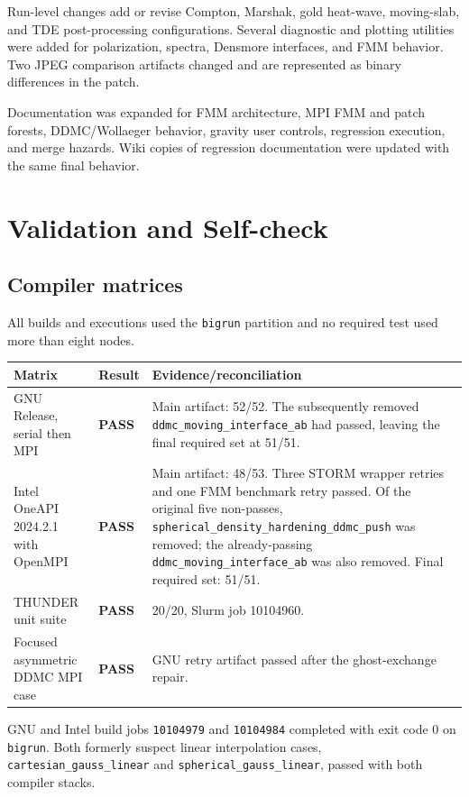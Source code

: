 \documentclass[10pt,a4paper]{article}
\newcommand{\pass}{\textcolor{passgreen}{\textbf{PASS}}}
\newcommand{\commit}[1]{\texttt{#1}}
\newcommand{\file}[1]{\nolinkurl{#1}}
\begin{document}
Run-level changes add or revise Compton, Marshak, gold heat-wave, moving-slab,
and TDE post-processing configurations.  Several diagnostic and plotting
utilities were added for polarization, spectra, Densmore interfaces, and FMM
behavior.  Two JPEG comparison artifacts changed and are represented as
binary differences in the patch.

Documentation was expanded for FMM architecture, MPI FMM and patch forests,
DDMC/Wollaeger behavior, gravity user controls, regression execution, and
merge hazards.  Wiki copies of regression documentation were updated with the
same final behavior.

\section{Validation and Self-check}

\subsection{Compiler matrices}

All builds and executions used the \file{bigrun} partition and no required test
used more than eight nodes.

\begin{longtable}{@{}p{40mm}p{28mm}p{77mm}@{}}
\toprule
Matrix & Result & Evidence/reconciliation \\
\midrule
\endhead
GNU Release, serial then MPI & \pass & Main artifact: 52/52.  The subsequently
removed \file{ddmc_moving_interface_ab} had passed, leaving the final required
set at 51/51. \\
Intel OneAPI 2024.2.1 with OpenMPI & \pass & Main artifact: 48/53.  Three STORM
wrapper retries and one FMM benchmark retry passed.  Of the original five
non-passes, \file{spherical_density_hardening_ddmc_push} was removed; the
already-passing \file{ddmc_moving_interface_ab} was also removed.  Final
required set: 51/51. \\
THUNDER unit suite & \pass & 20/20, Slurm job 10104960. \\
Focused asymmetric DDMC MPI case & \pass & GNU retry artifact passed after the
ghost-exchange repair. \\
\bottomrule
\end{longtable}

GNU and Intel build jobs \commit{10104979} and \commit{10104984} completed with
exit code 0 on \file{bigrun}.  Both formerly suspect linear interpolation cases,
\file{cartesian_gauss_linear} and \file{spherical_gauss_linear}, passed with
both compiler stacks.
\end{document}
